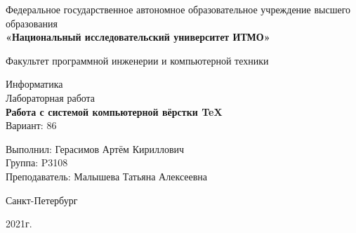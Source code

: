 \thispagestyle{empty}
\begin{center}
     Федеральное государственное автономное образовательное учреждение высшего образования\\
    \textbf{«Национальный исследовательский университет ИТМО»}
    
    \vspace{1em}
    Факультет программной инженерии и компьютерной техники

    \vspace{20em}
    
    {\Large Информатика}\\[1em]
    {\Large Лабораторная работа }\\[1em]
    {\Large \textbf{Работа с системой компьютерной вёрстки \TeX}}\\[1em]
    Вариант: 86
\end{center}

\vspace{20em}

\begin{flushright}
    Выполнил:
    Герасимов Артём Кириллович\\
    Группа: P3108\\
    Преподаватель:
    Малышева Татьяна Алексеевна\\
\end{flushright}

\vspace{\fill}

\begin{center}
Санкт-Петербург

2021г.
\end{center}